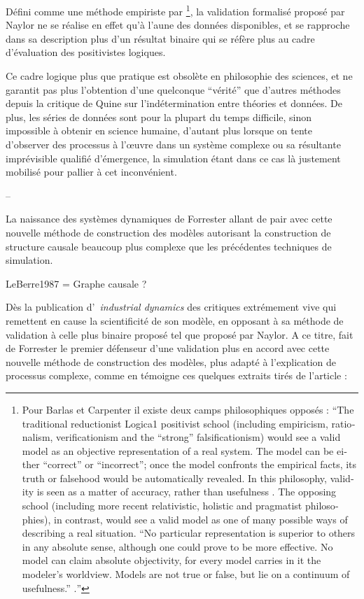 Défini comme une méthode empiriste par \textcite{Barlas1990} \footnote{Pour Barlas et Carpenter \textcite{Barlas1996} il existe deux camps philosophiques opposés : \foreignquote{english}{The traditional reductionist Logica1 positivist school (including empiricism, rationalism, verificationism and the “strong” falsificationism) would see a valid model as an objective representation of a real system. The model can be either “correct” or “incorrect”; once the model confronts the empirical facts, its truth or falsehood would be automatically revealed. In this philosophy, validity is seen as a matter of accuracy, rather than usefulness  \autocite{Barlas1990}. The opposing school (including more recent relativistic, holistic and pragmatist philosophies), in contrast, would see a valid model as one of many possible ways of describing a real situation. “No particular representation is superior to others in any absolute sense, although one could prove to be more effective. No model can claim absolute objectivity, for every model carries in it the modeler’s worldview. Models are not true or false, but lie on a continuum of usefulness.” \autocite{Barlas1990}.}}, la validation formalisé proposé par Naylor ne se réalise en effet qu'à l'aune des données disponibles, et se rapproche dans sa description plus d'un résultat binaire qui se réfère plus au cadre d'évaluation des positivistes logiques.

Ce cadre logique plus que pratique est obsolète en philosophie des sciences, et ne garantit pas plus l'obtention d'une quelconque \enquote{vérité} que d'autres méthodes depuis la critique de Quine sur l'indétermination entre théories et données. De plus, les séries de données sont pour la plupart du temps difficile, sinon impossible à obtenir en science humaine, d'autant plus lorsque on tente d'observer des processus à l’œuvre dans un système complexe ou sa résultante imprévisible qualifié d'émergence, la simulation étant dans ce cas là justement mobilisé pour pallier à cet inconvénient.



--


La naissance des systèmes dynamiques de Forrester allant de pair avec cette nouvelle méthode de construction des modèles autorisant la construction de structure causale beaucoup plus complexe que les précédentes techniques de simulation. 

LeBerre1987 = Graphe causale ? 

Dès la publication d' \textit{industrial dynamics} des critiques extrémement vive qui remettent en cause la scientificité de son modèle, en opposant à sa méthode de validation à celle plus binaire proposé tel que proposé par Naylor. A ce titre, \textcite{Barlas1990} fait de Forrester le premier défenseur d'une validation plus en accord avec cette nouvelle méthode de construction des modèles, plus adapté à l'explication de processus complexe, comme en témoigne ces quelques extraits tirés de l'article : 

